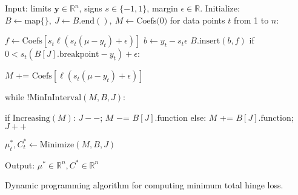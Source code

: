 \documentclass{article}
\begin{document}
\begin{algorithm}[H]
\begin{algorithmic}[1]
\STATE Input: 
limits $\mathbf y\in\mathbb R^n$, 
signs $s\in\{-1,1\}$, 
margin $\epsilon\in\mathbb R$.
\STATE Initialize: 
$B\gets\text{map}\{\},\ J\gets B.\text{end}(),\ M\gets\text{Coefs(0)}$
\STATE for data points $t$ from 1 to $n$:
\begin{ALC@g}
  \STATE $f\gets\text{Coefs}[s_t\ell(s_t(\mu-y_t)+\epsilon)]$
  \STATE $b\gets y_t - s_t\epsilon$
  \STATE $B.\text{insert}(b, f)$ \label{line:insert}
  \STATE if $0 < s_t(B[J].\text{breakpoint}-y_t)+\epsilon$:
  \begin{ALC@g}
    \STATE $M$ += $\text{Coefs}[\ell(s_t(\mu-y_t)+\epsilon)]$
    \label{line:add-coefs}
  \end{ALC@g}
  \STATE while $!\text{MinInInterval}(M,B,J)$:
  \label{line:while}
  \begin{ALC@g}
    \STATE if $\text{Increasing}(M)$: $J--$; $M$ $-$= $B[J].\text{function}$
    \label{line:increasing}
    \STATE else: $M$ += $B[J].\text{function}$; $J++$
    \label{line:else}
  \end{ALC@g}
  \STATE $\mu_t^*, C_t^*\gets\text{Minimize}(M,B,J)$
  \label{line:Minimize}
\end{ALC@g}
\STATE Output: $\mu^*\in\mathbb R^n, C^*\in\mathbb R^n$
\caption{\label{algo:dp}Dynamic programming algorithm for
  computing minimum total hinge loss.}
\end{algorithmic}
\end{algorithm}



\end{document}
